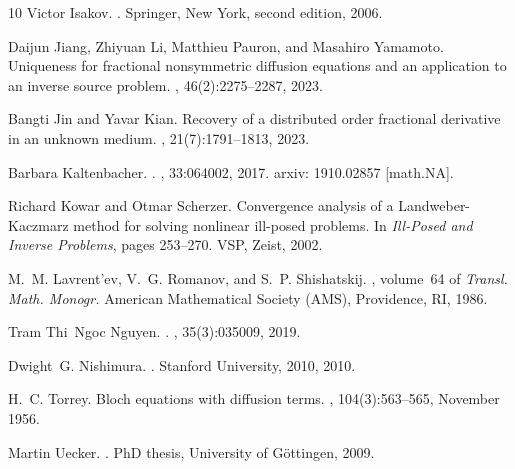 \documentclass{ws-m3as}
\begin{document}
\begin{thebibliography}{10}
Victor Isakov.
.
\newblock Springer, New York, second edition, 2006.

Daijun Jiang, Zhiyuan Li, Matthieu Pauron, and Masahiro Yamamoto.
\newblock Uniqueness for fractional nonsymmetric diffusion equations and an
  application to an inverse source problem.
, 46(2):2275--2287,
  2023.

Bangti Jin and Yavar Kian.
\newblock Recovery of a distributed order fractional derivative in an unknown
  medium.
, 21(7):1791--1813, 2023.

Barbara Kaltenbacher.
.
, 33:064002, 2017.
\newblock arxiv: 1910.02857 [math.NA].

Richard Kowar and Otmar Scherzer.
\newblock Convergence analysis of a {L}andweber-{K}aczmarz method for solving
  nonlinear ill-posed problems.
\newblock In {\em Ill-Posed and Inverse Problems}, pages 253--270. VSP, Zeist,
  2002.

M.~M. Lavrent'ev, V.~G. Romanov, and S.~P. Shishatskij.
, volume~64 of {\em Transl. Math. Monogr.}
\newblock American Mathematical Society (AMS), Providence, RI, 1986.

Tram Thi~Ngoc Nguyen.
.
, 35(3):035009, 2019.

Dwight~G. Nishimura.
.
\newblock Stanford University, 2010, 2010.

H.~C. Torrey.
\newblock Bloch equations with diffusion terms.
, 104(3):563--565, November 1956.

Martin Uecker.
.
\newblock PhD thesis, University of G\"ottingen, 2009.


\end{thebibliography}
\end{document}
